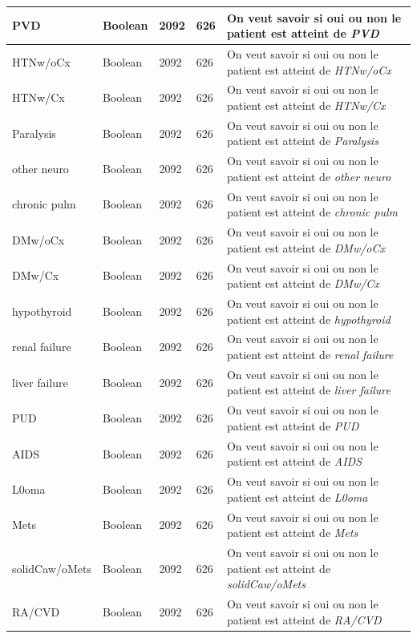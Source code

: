 \documentclass[12pt, french]{report}
\begin{document}
\begin{longtable}{ | p{} | p{} | p{}  | p{} | p{} |  }
PVD & Boolean & 2092 & 626& On veut savoir si oui ou non le patient est atteint de \textit{PVD} \\ \hline 
HTNw/oCx & Boolean & 2092 & 626& On veut savoir si oui ou non le patient est atteint de \textit{HTNw/oCx} \\ \hline 
HTNw/Cx & Boolean & 2092 & 626& On veut savoir si oui ou non le patient est atteint de \textit{HTNw/Cx} \\ \hline 
Paralysis & Boolean & 2092 & 626& On veut savoir si oui ou non le patient est atteint de \textit{Paralysis} \\ \hline 
other neuro & Boolean & 2092 & 626& On veut savoir si oui ou non le patient est atteint de \textit{other neuro} \\ \hline 
chronic pulm & Boolean & 2092 & 626& On veut savoir si oui ou non le patient est atteint de \textit{chronic pulm} \\ \hline 
DMw/oCx & Boolean & 2092 & 626& On veut savoir si oui ou non le patient est atteint de \textit{DMw/oCx} \\ \hline 
DMw/Cx & Boolean & 2092 & 626& On veut savoir si oui ou non le patient est atteint de \textit{DMw/Cx} \\ \hline 
hypothyroid & Boolean & 2092 & 626& On veut savoir si oui ou non le patient est atteint de \textit{hypothyroid} \\ \hline 
renal failure & Boolean & 2092 & 626& On veut savoir si oui ou non le patient est atteint de \textit{renal failure} \\ \hline 
liver failure & Boolean & 2092 & 626& On veut savoir si oui ou non le patient est atteint de \textit{liver failure} \\ \hline 
PUD & Boolean & 2092 & 626& On veut savoir si oui ou non le patient est atteint de \textit{PUD} \\ \hline 
AIDS & Boolean & 2092 & 626& On veut savoir si oui ou non le patient est atteint de \textit{AIDS} \\ \hline 
L0oma & Boolean & 2092 & 626& On veut savoir si oui ou non le patient est atteint de \textit{L0oma} \\ \hline 
Mets & Boolean & 2092 & 626& On veut savoir si oui ou non le patient est atteint de \textit{Mets} \\ \hline 
solidCaw/oMets & Boolean & 2092 & 626& On veut savoir si oui ou non le patient est atteint de \textit{solidCaw/oMets} \\ \hline 
RA/CVD & Boolean & 2092 & 626& On veut savoir si oui ou non le patient est atteint de \textit{RA/CVD} \\ \hline 

\end{longtable}
\end{document}
